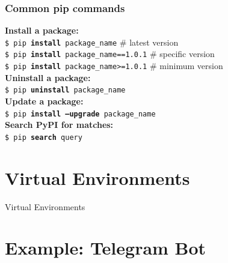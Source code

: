     \begin{frame}
        \frametitle{Common pip commands}
        \LARGE
        \pause
        \textbf{Install a package:}\\
        \pause
        \texttt{\$ pip \textbf{install} package\_name}  \# latest version \\
        \pause
        \texttt{\$ pip \textbf{install} package\_name==1.0.1}  \# specific version \\
        \pause
        \texttt{\$ pip \textbf{install} package\_name>=1.0.1}  \# minimum version \\
        \pause        
        \textbf{Uninstall a package:}\\
        \pause        
        \texttt{\$ pip \textbf{uninstall} package\_name}\\
        \pause
        \textbf{Update a package:}\\
        \pause
        \texttt{\$ pip \textbf{install --upgrade} package\_name}\\
        \pause
        \textbf{Search PyPI for matches:}\\
        \pause
        \texttt{\$ pip \textbf{search} query}
    \end{frame}

    \section{Virtual Environments}

    \begin{frame}{Virtual Environments}
    
    
    \end{frame}

    \begin{frame}{}
        
    
    \end{frame}

    \section{Example: Telegram Bot}
    
    \begin{frame}{}
    
        
    
    \end{frame}

    \begin{frame}{}
    
        
    \end{frame}
    
